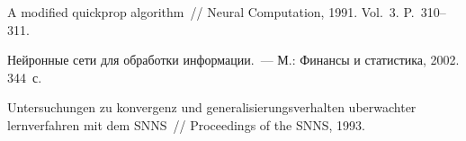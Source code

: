 \begin{multicols}{2}
{{\begin{thebibliography}{99}
A modified quickprop algorithm~// Neural Computation, 1991. Vol.~3. P.~310--311.

Нейронные сети для обработки информации.~--- М.: Финансы и статистика, 2002. 344~с.


\label{end\stat}

Untersuchungen zu konvergenz und generalisierungsverhalten uberwachter lernverfahren mit
dem SNNS~// Proceedings of the SNNS, 1993.



 \end{thebibliography}
}
}

\end{multicols}
